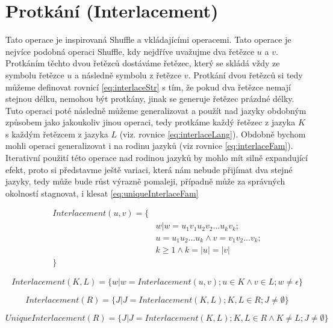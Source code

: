 \section{Protkání (Interlacement)}
Tato operace je inspirovaná Shuffle a vkládajícími operacemi. Tato operace je nejvíce podobná operaci Shuffle, kdy nejdříve uvažujme dva řetězce $u$ a $v$. Protkáním těchto dvou řetězců dostáváme řetězec, který se skládá vždy ze symbolu řetězce $u$ a následně symbolu z řetězce $v$. Protkání dvou řetězců si tedy můžeme definovat rovnicí \ref{eq:interlaceStr} s tím, že pokud dva řetězce nemají stejnou délku, nemohou být protkány, jinak se generuje řetězec prázdné délky. Tuto operaci poté následně můžeme generalizovat a použít nad jazyky obdobným způsobem jako jakoukoliv jinou operaci, tedy protkáme každý řetězec z jazyka $K$ s každým řetězcem z jazyka $L$ (viz. rovnice \ref{eq:interlaceLang}). Obdobně bychom mohli operaci generalizovat i na rodinu jazyků (viz rovnice \ref{eq:interlaceFam}). Iterativní použití této operace nad rodinou jazyků by mohlo mít silně expandující efekt, proto si představme ještě variaci, která nám nebude přijímat dva stejné jazyky, tedy může bude růst výrazně pomaleji, případně může za správných okolností stagnovat, i klesat \ref{eq:uniqueInterlaceFam}

\begin{equation}\label{eq:interlaceStr}
	\begin{split}
	Interlacement(u,v) = \{&\\
		&w|w=u_{1}v_{1}u_{2}v_{2}...u_{k}v_{k};\\
		&u=u_{1}u_{2}...u_{k} \land v=v_{1}v_{2}...v_{k};\\
		&k \geq 1 \land k= |u| = |v|\\
	\}&
	\end{split}
\end{equation}

\begin{equation}\label{eq:interlaceLang}
	Interlacement(K,L) = \{w|w=Interlacement(u,v); u\in K \land v \in L; w \neq \epsilon\}
\end{equation}


\begin{equation}\label{eq:interlaceFam}
	Interlacement(R) = \{J|J=Interlacement(K,L); K,L\in R; J\neq \emptyset\}
\end{equation}


\begin{equation}\label{eq:uniqueInterlaceFam}
UniqueInterlacement(R) = \{J|J=Interlacement(K,L); K,L\in R \land K \neq L;J \neq \emptyset\}
\end{equation}


